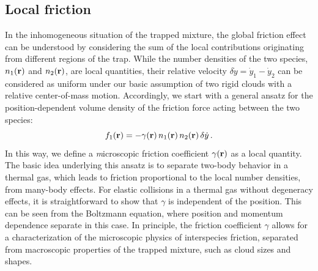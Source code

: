 \subsection{Local friction} \label{ssec:localfriction}

In the inhomogeneous situation of the trapped mixture, the global friction effect can be understood by considering the sum of the local contributions originating from different regions of the trap. 
While the number densities of the two species, $n_1({\textbf r})$ and $n_2({\textbf r})$, are local quantities, their relative velocity $\delta \dot{y} = \dot{y}_1-\dot{y}_2$ can be considered as uniform under our basic assumption of two rigid clouds with a relative center-of-mass motion. Accordingly, we start with a general ansatz for the position-dependent volume density of the friction force acting between the two species:
\begin{equation}
f_1({\textbf r}) %
= - \gamma({\textbf r}) \, n_1({\textbf r}) \, n_2({\textbf r})
\, \delta\dot{y} \, .
\label{eq:localfriction}
\end{equation}
{In this way, we define a {\textit microscopic friction coefficient} $\gamma({\textbf r})$ as a local quantity. The basic idea underlying this ansatz is to separate two-body behavior in a thermal gas, which leads to friction proportional to the local number densities, from many-body effects.
For elastic collisions in a thermal gas without degeneracy effects, it is straightforward to show that $\gamma$ is independent of the position. This can be seen from the Boltzmann equation, where position and momentum dependence separate in this case.
In principle, the friction coefficient $\gamma$ allows for a characterization of the {microscopic} physics of interspecies friction, separated from macroscopic properties of the trapped mixture, such as cloud sizes and shapes. 
}

